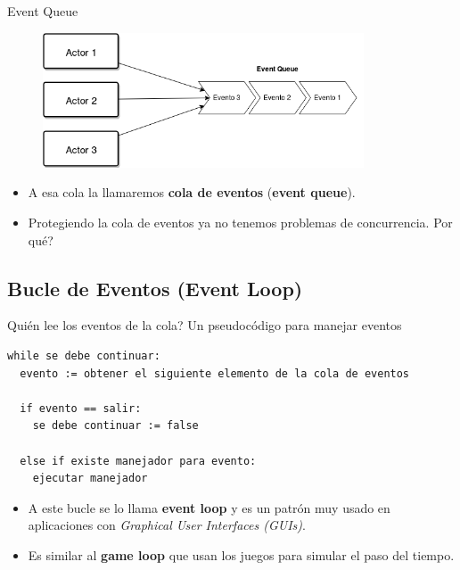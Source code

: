 \begin{frame}{Event Queue}{
}

  \begin{figure}
    \centering
    \includegraphics[width=0.85\textwidth]{./producers_to_queue.png}
  \end{figure}

  \begin{itemize}

    \item A esa cola la llamaremos \textbf{cola de eventos} (\textbf{event queue}).

    \item Protegiendo la cola de eventos ya no tenemos problemas de concurrencia. \textquestiondown Por qu\'e?

  \end{itemize}

\end{frame}


\subsection{Bucle de Eventos (Event Loop)}

\begin{frame}{\textquestiondown Qui\'en lee los eventos de la cola?}{
  Un pseudoc\'odigo para manejar eventos
}

  \begin{lstlisting}[style=normal,firstnumber=1]
while se debe continuar:
  evento := obtener el siguiente elemento de la cola de eventos
  
  if evento == salir:
    se debe continuar := false

  else if existe manejador para evento:
    ejecutar manejador

  \end{lstlisting}

  \begin{itemize}

    \item A este bucle se lo llama \textbf{event loop} y es un patr\'on muy usado en aplicaciones con \textit{Graphical User Interfaces (GUIs)}.

    \item Es similar al \textbf{game loop} que usan los juegos para simular el paso del tiempo.

  \end{itemize}

\end{frame}

